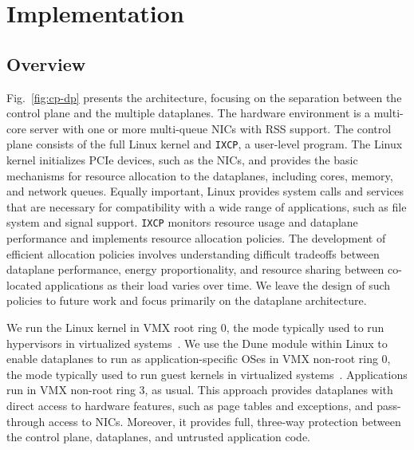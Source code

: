  
\section{\ix Implementation}
\label{sec:impl}





\subsection{Overview}
\label{sec:impl:overview}

Fig.~\ref{fig:cp-dp} presents the \ix architecture, focusing on the
separation between the control plane and the multiple dataplanes.  The
hardware environment is a multi-core server with one or more
multi-queue NICs with RSS support. The \ix control plane consists of the full Linux kernel and
\texttt{IXCP}, a user-level program. The Linux kernel
initializes PCIe devices, such as the NICs, and provides the basic
mechanisms for resource allocation to the dataplanes, including cores,
memory, and network queues. Equally important, Linux provides system
calls and services that are necessary for compatibility with a wide
range of applications, such as file system and signal
support. \texttt{IXCP} monitors resource usage and dataplane
performance and implements resource allocation policies. The
development of efficient allocation policies involves understanding
difficult tradeoffs between dataplane performance, energy
proportionality, and resource sharing between co-located applications
as their load varies over time. We leave the design of such policies
to future work and focus primarily on the \ix dataplane architecture.

We run the Linux kernel in VMX root ring 0, the mode typically used to
run hypervisors in virtualized
systems~\cite{DBLP:journals/computer/UhligNRSMABKLS05}. We use the
Dune module within Linux to enable dataplanes to run as
application-specific OSes in VMX non-root ring 0, the mode
typically used to run guest kernels in virtualized
systems~\cite{dune}.  Applications run in VMX non-root ring 3, as
usual.  This approach provides dataplanes with direct access to
hardware features, such as page tables and exceptions, and pass-through
access to NICs. Moreover, it provides full, three-way protection
between the control plane, dataplanes, and untrusted application code.

